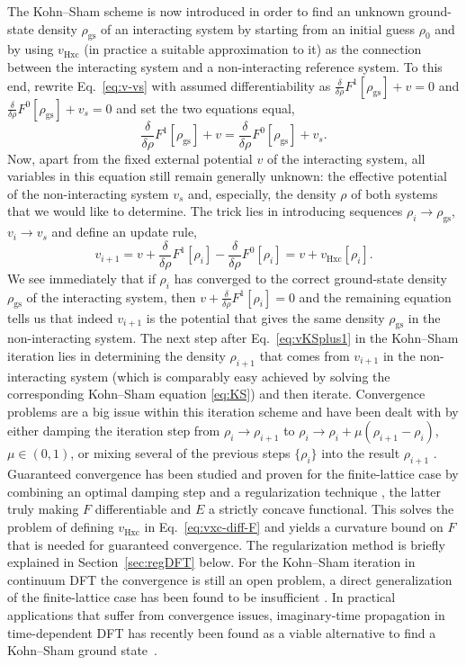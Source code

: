 \documentclass[journal=apcach,manuscript=article,layout=twocolumn]{achemso}
\newcommand{\rhogs}{{\rho_\mathrm{gs}}}
\newcommand{\vHxc}{v_\mathrm{Hxc}}
\newcommand{\der}{\frac{\delta}{\delta \rho}}
\newcommand{\changed}[1] {{ {#1}}} %
\begin{document}
The \changed{Kohn--Sham} scheme is now introduced in order to find an unknown ground-state density $\rhogs$ of an interacting system by starting from an initial guess $\rho_0$ and by using $\vHxc$ (in practice a suitable approximation to it) as the connection between the interacting system and a non-interacting reference system.
To this end, rewrite Eq.~\eqref{eq:v-vs} with assumed differentiability as $\der F^1[\rhogs]+v=0$ and $\der F^0[\rhogs]+v_s=0$ and set the two equations equal,
\begin{equation*}
    \der F^1[\rhogs]+v = \der F^0[\rhogs]+v_s.
\end{equation*}
%
Now, apart from the fixed external potential $v$ of the interacting system, all variables in this equation still remain generally unknown: the effective potential of the non-interacting system $v_s$ and, especially, the density $\rho$ of both systems that we would like to determine. The trick lies in introducing sequences $\rho_i \to \rhogs$, $v_i \to v_s$ and define an update rule,
\begin{equation}\label{eq:vKSplus1}
    v_{i+1} = v + \der F^1[\rho_i] - \der F^0[\rho_i] = v + \vHxc[\rho_i].
\end{equation}
%
We see immediately that if $\rho_i$ has converged to the correct ground-state density $\rhogs$ of the interacting system, then $v + \der F^1[\rho_i]=0$ and the remaining equation tells us that indeed $v_{i+1}$ is the potential that gives the same density $\rhogs$ in the non-interacting system. The next step after Eq.~\eqref{eq:vKSplus1} in the Kohn--Sham iteration lies in determining the density $\rho_{i+1}$ that comes from $v_{i+1}$ in the non-interacting system (which is comparably easy achieved by solving the corresponding Kohn--Sham equation \eqref{eq:KS}) and then iterate. Convergence problems are a big issue within this iteration scheme and have been dealt with by either damping the iteration step from $\rho_i \to \rho_{i+1}$ to $\rho_i \to \rho_i + \mu ( \rho_{i+1} - \rho_i )$, $\mu \in (0,1)$, or mixing several of the previous steps $\{\rho_i\}$ into the result $\rho_{i+1}$ \cite{pulay1980convergence,cances2000damping,cances2021convergence}.  Guaranteed convergence has been studied and proven for the finite-lattice case \cite{penz2019guaranteed,penz2020erratum,Kvaal2022-MY} by combining an optimal damping step and a regularization technique \cite{Kvaal2014,Kvaal2022-MY}, the latter truly making $F$ differentiable and $E$ a strictly concave functional. This solves the problem of defining $\vHxc$ in Eq.~\eqref{eq:vxc-diff-F} and yields a curvature bound on $F$ that is needed for guaranteed convergence. The regularization method is briefly explained in Section~\ref{sec:regDFT} below. For the Kohn--Sham iteration in continuum DFT the convergence is still an open problem, a direct generalization of the finite-lattice case has been found to be insufficient \cite{penz2020convergence}.
\changed{In practical applications that suffer from convergence issues, imaginary-time propagation in time-dependent DFT has recently been found as a viable alternative to find a Kohn--Sham ground state~\cite{flamant2019imaginary}.}
\end{document}
